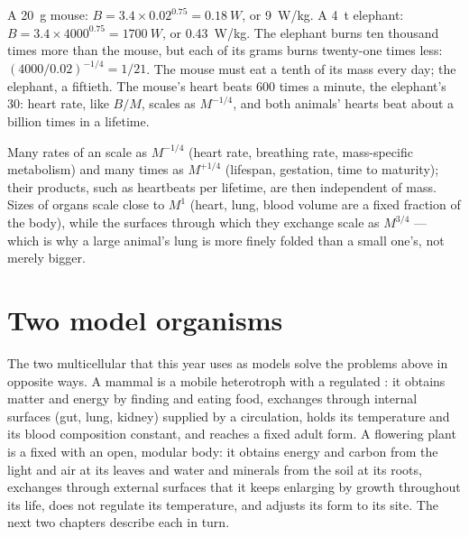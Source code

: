 \begin{example}\label{ex:b1:organism-environment:mouseelephant}
A \qty{20}{g} mouse: $B = 3.4\times 0.02^{0.75} = \qty{0.18}{W}$, or
\qty{9}{W/kg}. A \qty{4}{t} elephant: $B = 3.4\times 4000^{0.75} =
\qty{1700}{W}$, or \qty{0.43}{W/kg}. The elephant burns ten thousand
times more than the mouse, but each of its grams burns twenty-one times
less: $(4000/0.02)^{-1/4} = 1/21$. The mouse must eat a tenth of its
mass every day; the elephant, a fiftieth. The mouse's heart beats
\qty{600}{} times a minute, the elephant's \qty{30}{}: heart rate, like
$B/M$, scales as $M^{-1/4}$, and both animals' hearts beat about a
billion times in a lifetime.
\end{example}

\begin{remark}\label{rem:b1:organism-environment:consequences}
Many rates of an  scale as $M^{-1/4}$ (heart rate, breathing
rate, mass-specific metabolism) and many times as $M^{+1/4}$ (lifespan,
gestation, time to maturity); their products, such as heartbeats per
lifetime, are then independent of mass. Sizes of organs scale close to
$M^{1}$ (heart, lung, blood volume are a fixed fraction of the body),
while the surfaces through which they exchange scale as $M^{3/4}$ ---
which is why a large animal's lung is more finely folded than a small
one's, not merely bigger.
\end{remark}

\section{Two model organisms}

\begin{proposition}\label{prop:b1:organism-environment:models}
The two multicellular  that this year uses as models solve the
problems above in opposite ways. A mammal is a mobile heterotroph with
a regulated : it obtains matter and energy by
finding and eating food, exchanges through internal surfaces (gut, lung,
kidney) supplied by a circulation, holds its temperature and its blood
composition constant, and reaches a fixed adult form. A flowering plant
is a fixed  with an open, modular body: it obtains energy
and carbon from the light and air at its leaves and water and minerals
from the soil at its roots, exchanges through external surfaces that it
keeps enlarging by growth throughout its life, does not regulate its
temperature, and adjusts its form to its site. The next two chapters
describe each in turn.
\end{proposition}

